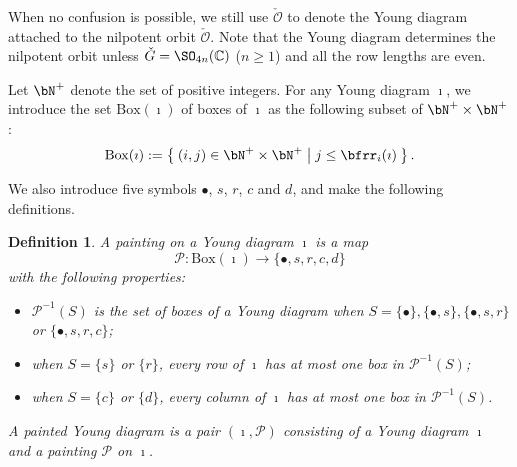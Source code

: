 \documentclass[12pt,a4paper]{amsart}
\def\subset{\subseteq}
\newcommand{\CO}{{\mathcal {O}}}
\newcommand{\CP}{{\mathcal {P}}}
\numberwithin{equation}{section}
\newtheorem{defn}[thm]{Definition}
\theoremstyle{remark}
\def\CP{\mathsf{CP}}
\begin{document}
When no confusion is possible, we still use $\check \CO$ to denote the Young diagram attached to the nilpotent orbit $\check \CO$. Note that the Young diagram determines the nilpotent orbit unless $\check G=\SO_{4n}(\C)$ ($n\geq 1$) and all the row lengths are even.

Let $\bN^+$ denote the set of positive integers. For any Young diagram $\imath$, we introduce the set $\mathrm{Box}(\imath)$ of
boxes of $\imath$ as the following subset of $\bN^+\times \bN^+$:
\[
  \mathrm{Box}(\imath):=\Set{(i,j)\in\bN^+\times \bN^+| j\leq \bfrr_i(\imath)}.
\]



\renewcommand{\CP}{\mathcal{P}} We also introduce five symbols $\bullet$, $s$,
$r$, $c$ and $d$, and make the following definitions.
\begin{defn}
  A painting on a Young diagram $\imath$ is a map
  \[
    \mathcal P: \mathrm{Box}(\imath) \rightarrow \{\bullet, s, r, c, d \}
  \]
  with the following properties:
  \begin{itemize}
    \item $\mathcal P^{-1}(S)$ is the set of boxes of a Young diagram when
          $S=\{\bullet\}, \{\bullet, s \}, \{\bullet, s, r\}$ or
          $\{\bullet, s, r, c \} $;
    \item when $S=\{s\}$ or $ \{r\}$, every row of $\imath$ has at most one box
          in $\CP^{-1}(S)$;
    \item when $S=\{c\}$ or $ \{d \}$, every column of $\imath$ has at most one
          box in $\CP^{-1}(S)$.
  \end{itemize}
A painted Young diagram is a pair $(\imath, \CP)$ consisting of a Young diagram $\imath$ and a painting $\CP$ on $\imath$.
\end{defn}
\end{document}
